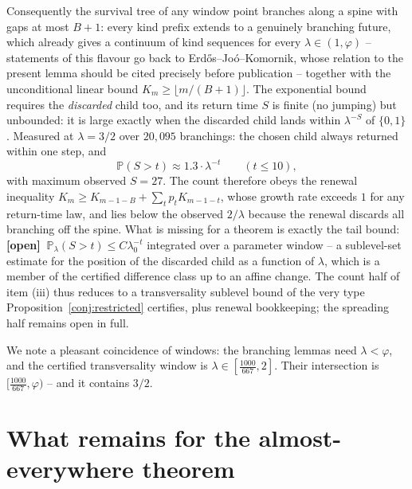 \documentclass[11pt]{amsart}
\theoremstyle{remark}\newtheorem{remark}[lemma]{Remark}
\begin{document}
Consequently the survival tree of any window point branches along a spine with
gaps at most $B+1$: every kind prefix extends to a genuinely branching future,
which already gives a continuum of kind sequences for every
$\lambda\in(1,\varphi)$ -- statements of this flavour go back to
Erd\H{o}s--Jo\'o--Komornik, whose relation to the present lemma should be
cited precisely before publication -- together with the unconditional linear
bound
$K_m\geq\lfloor m/(B+1)\rfloor$. The exponential bound requires the
\emph{discarded} child too, and its return time $S$ is finite (no jumping) but
unbounded: it is large exactly when the discarded child lands within
$\lambda^{-S}$ of $\{0,1\}$. Measured at $\lambda=3/2$ over $20{,}095$
branchings: the chosen child always returned within one step, and
\[
\mathbb P(S>t)\approx1.3\cdot\lambda^{-t}\qquad(t\leq10),
\]
with maximum observed $S=27$. The count therefore obeys the renewal
inequality $K_m\geq K_{m-1-B}+\sum_tp_tK_{m-1-t}$, whose growth rate exceeds
$1$ for any return-time law, and lies below the observed $2/\lambda$ because
the renewal discards all branching off the spine. What is missing for a
theorem is exactly the tail bound: \textbf{[open]} $\ \mathbb
P_\lambda(S>t)\leq C\lambda_0^{-t}$ integrated over a parameter window -- a
sublevel-set estimate for the position of the discarded child as a function of
$\lambda$, which is a member of the certified difference class up to an affine
change. The count half of item (iii) thus reduces to a transversality
sublevel bound of the very type Proposition~\ref{conj:restricted} certifies,
plus renewal bookkeeping; the spreading half remains open in full.

We note a pleasant coincidence of windows: the branching lemmas need
$\lambda<\varphi$, and the certified transversality window is
$\lambda\in[\tfrac{1000}{667},2]$. Their intersection is
$[\tfrac{1000}{667},\varphi)$ -- and it contains $3/2$.

\section{What remains for the almost-everywhere theorem}
\end{document}
